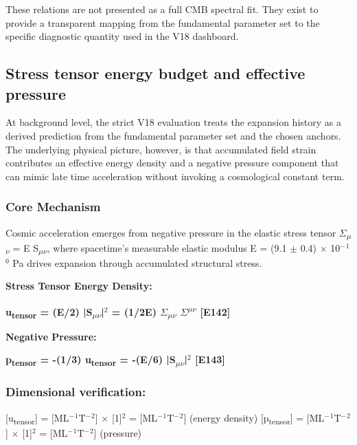 \documentclass[11pt,a4paper]{article}
\begin{document}
These relations are not presented as a full CMB spectral fit. They exist to provide a transparent mapping from the fundamental parameter set to the specific diagnostic quantity used in the V18 dashboard.

\subsection{Stress tensor energy budget and effective pressure}
At background level, the strict V18 evaluation treats the expansion history as a derived prediction from the fundamental parameter set and the chosen anchors. The underlying physical picture, however, is that accumulated field strain contributes an effective energy density and a negative pressure component that can mimic late time acceleration without invoking a cosmological constant term.

\subsubsection{Core Mechanism}
Cosmic acceleration emerges from negative pressure in the elastic stress tensor $\Sigma$\textsubscript{$\mu$$\nu$} = E S\textsubscript{$\mu$$\nu$}, where spacetime's measurable elastic modulus E = (9.1 $\pm$ 0.4) $\times$ 10$^{-}$$^{1}$$^{0}$ Pa drives expansion through accumulated structural stress.

\textbf{Stress Tensor Energy Density:}

\textbf{u\textsubscript{tensor} = (E/\allowbreak{}2) |S\textsubscript{$\mu$$\nu$}|$^{2}$ = (1/\allowbreak{}2E) $\Sigma$\textsubscript{$\mu$$\nu$} $\Sigma$\textsuperscript{$\mu$$\nu$} [E142]}

\textbf{Negative Pressure:}

\textbf{p\textsubscript{tensor} = -(1/\allowbreak{}3) u\textsubscript{tensor} = -(E/\allowbreak{}6) |S\textsubscript{$\mu$$\nu$}|$^{2}$ [E143]}

\begin{mdframed}[linecolor=accent,linewidth=0.5pt,backgroundcolor=callout-bg,leftline=true,rightline=true,topline=true,bottomline=true,innerleftmargin=8pt,innerrightmargin=8pt,innertopmargin=6pt,innerbottommargin=6pt]
\subsubsection{Dimensional verification:}
[u\textsubscript{tensor}] = [ML$^{-}$$^{1}$T$^{-}$$^{2}$] $\times$ [1]$^{2}$ = [ML$^{-}$$^{1}$T$^{-}$$^{2}$] \checkmark{} (energy density)\newline{}
[p\textsubscript{tensor}] = [ML$^{-}$$^{1}$T$^{-}$$^{2}$] $\times$ [1]$^{2}$ = [ML$^{-}$$^{1}$T$^{-}$$^{2}$] \checkmark{} (pressure)
\end{mdframed}
\end{document}
